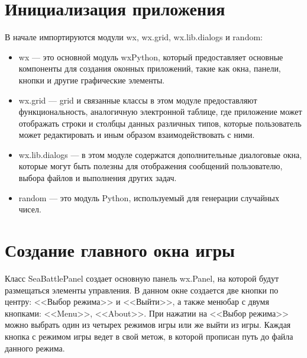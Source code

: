 \section{\label{sec:ch02/sec02}Инициализация приложения}
В начале импортируются модули wx, wx.grid, wx.lib.dialogs и random:
\begin{itemize}
\item wx --- это основной модуль wxPython, который предоставляет основные компоненты для создания оконных приложений, такие как окна, панели, кнопки и другие графические элементы.
\item wx.grid --- grid и связанные классы в этом модуле предоставляют функциональность, аналогичную электронной таблице, где приложение может отображать строки и столбцы данных различных типов, которые пользователь может редактировать и иным образом взаимодействовать с ними.
\item wx.lib.dialogs --- в этом модуле содержатся дополнительные диалоговые окна, которые могут быть полезны для отображения сообщений пользователю, выбора файлов и выполнения других задач.
\item random --- это модуль Python, используемый для генерации случайных чисел.
\end{itemize}

\section{\label{sec:ch02/sec03}Создание главного окна игры}
Класс SeaBattlePanel создает основную панель wx.Panel, на которой будут размещаться элементы управления. В данном окне создается две кнопки по центру: <<Выбор режима>> и <<Выйти>>, а также менюбар с двумя кнопками: <<Menu>>, <<About>>. 
При нажатии на <<Выбор режима>> можно выбрать один из четырех режимов игры или же выйти из игры.
Каждая кнопка с режимом игры ведет в свой метож, в которой прописан путь до файла данного режима.

